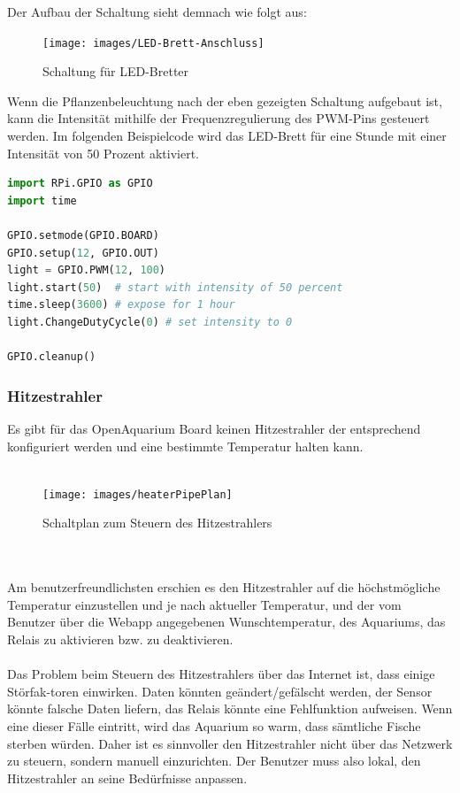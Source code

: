 Der Aufbau der Schaltung sieht demnach wie folgt aus: \\
\begin{figure}[ht]
    \centering
    \texttt{[image: images/LED-Brett-Anschluss]}
    \caption{Schaltung für LED-Bretter}
\end{figure} 
\newpage
Wenn die Pflanzenbeleuchtung nach der eben gezeigten Schaltung aufgebaut ist, kann die Intensität mithilfe der Frequenzregulierung des PWM-Pins gesteuert werden. Im folgenden Beispielcode wird das LED-Brett für eine Stunde mit einer Intensität von 50 Prozent aktiviert.
\begin{lstlisting}[language=Python, caption=Steuern der Pflanzenbeleuchtung]
import RPi.GPIO as GPIO
import time

GPIO.setmode(GPIO.BOARD)
GPIO.setup(12, GPIO.OUT)
light = GPIO.PWM(12, 100)
light.start(50)  # start with intensity of 50 percent
time.sleep(3600) # expose for 1 hour
light.ChangeDutyCycle(0) # set intensity to 0

GPIO.cleanup()
\end{lstlisting}

\newpage
\subsubsection{Hitzestrahler}
Es gibt für das OpenAquarium Board keinen Hitzestrahler der entsprechend konfiguriert werden und eine bestimmte Temperatur halten kann. \\ \mbox{} \\
\begin{figure}[ht]
  \centering
  \texttt{[image: images/heaterPipePlan]}
  \caption{Schaltplan zum Steuern des Hitzestrahlers}
\end{figure} \mbox{} \\ \mbox{} \\
Am benutzerfreundlichsten erschien es den Hitzestrahler auf die höchstmögliche Temperatur einzustellen und je nach aktueller Temperatur, und der vom Benutzer über die Webapp angegebenen Wunschtemperatur, des Aquariums, das Relais zu aktivieren bzw. zu deaktivieren. \\ \mbox{} \\
Das Problem beim Steuern des Hitzestrahlers über das Internet ist, dass einige Störfak-toren einwirken. Daten könnten geändert/gefälscht werden, der Sensor könnte falsche Daten liefern, das Relais könnte eine Fehlfunktion aufweisen. Wenn eine dieser Fälle eintritt, wird das Aquarium so warm, dass sämtliche Fische sterben würden. Daher ist es sinnvoller den Hitzestrahler nicht über das Netzwerk zu steuern, sondern manuell einzurichten. Der Benutzer muss also lokal, den Hitzestrahler an seine Bedürfnisse anpassen. 
\newpage
